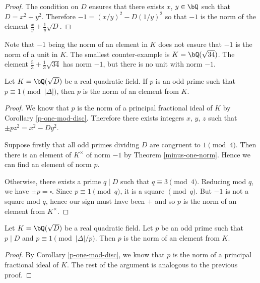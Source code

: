\begin{proof}
The condition on $D$ ensures that there exists $x$, $y \in \bQ$ such that $D = x^2 + y^2$. Therefore $-1 = (x / y)^2 - D(1/ y)^2$ so that $-1$ is the norm of the element $\frac{x}{y} + \frac{1}{y} \sqrt{D}$.
\end{proof}

Note that $-1$ being the norm of an element in $K$ does not ensure that $-1$ is the norm of a unit in $K$. The smallest counter-example is $K = \bQ(\sqrt{34})$. The element $\frac{5}{3} + \frac{1}{3}\sqrt{34}$ has norm $-1$, but there is no unit with norm $-1$. 

\begin{thm}\label{p-norm-elem-1}
    Let $K = \bQ(\sqrt{D})$ be a real quadratic field.  If $p$ is an odd prime such that $p \equiv 1 \pmod {|\Delta|}$, then $p$ is the norm of an element from $K$. 
\end{thm}

\begin{proof}
    We know that $p$ is the norm of a principal fractional ideal of $K$ by Corollary \ref{p-one-mod-disc}. 
    Therefore there exists integers $x$, $y$, $z$ such that $\pm p z^2 = x^2 - Dy^2$. 
    
    Suppose firstly that all odd primes dividing $D$ are congruent to $1 \pmod 4$. Then there is an element of $K^{\times}$ of norm $-1$ by Theorem \ref{minus-one-norm}. Hence we can find an element of norm $p$.

    Otherwise, there exists a prime $q \mid D$ such that $q \equiv 3 \pmod 4$. Reducing mod $q$, we have
    $ \pm p = \square$. Since $p \equiv 1 \pmod q$, it is a square $\pmod q$. But $-1$ is not a square mod $q$, hence our sign must have been $+$ and so $p$ is the norm of an element from $K^{\times}$.
\end{proof}


\begin{thm}\label{p-norm-elem-2}
    Let $K = \bQ(\sqrt{D})$ be a real quadratic field. Let $p$ be an odd prime such that $p \mid D$ and $p \equiv 1 \pmod {|\Delta| / p}$. Then $p$ is the norm of an element from $K$. 
\end{thm}

\begin{proof}
    By Corollary \ref{p-one-mod-disc}, we know that $p$ is the norm of a principal fractional ideal of $K$. The rest of the argument is analogous to the previous proof.
\end{proof}  

